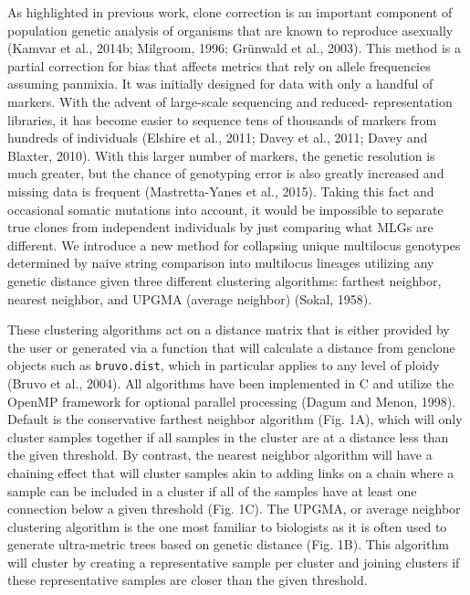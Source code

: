 \documentclass{frontiersSCNS} %
\begin{document}
As highlighted in previous work, clone correction is an important
component of population genetic analysis of organisms that are known to
reproduce asexually (Kamvar et al., 2014b; Milgroom, 1996; Grünwald et
al., 2003). This method is a partial correction for bias that affects
metrics that rely on allele frequencies assuming panmixia. It was
initially designed for data with only a handful of markers. With the
advent of large-scale sequencing and reduced- representation libraries,
it has become easier to sequence tens of thousands of markers from
hundreds of individuals (Elshire et al., 2011; Davey et al., 2011; Davey
and Blaxter, 2010). With this larger number of markers, the genetic
resolution is much greater, but the chance of genotyping error is also
greatly increased and missing data is frequent (Mastretta-Yanes et al.,
2015). Taking this fact and occasional somatic mutations into account,
it would be impossible to separate true clones from independent
individuals by just comparing what MLGs are different. We introduce a
new method for collapsing unique multilocus genotypes determined by
naive string comparison into multilocus lineages utilizing any genetic
distance given three different clustering algorithms: farthest neighbor,
nearest neighbor, and UPGMA (average neighbor) (Sokal, 1958).

These clustering algorithms act on a distance matrix that is either
provided by the user or generated via a function that will calculate a
distance from genclone objects such as \texttt{bruvo.dist}, which in
particular applies to any level of ploidy (Bruvo et al., 2004). All
algorithms have been implemented in C and utilize the OpenMP framework
for optional parallel processing (Dagum and Menon, 1998). Default is the
conservative farthest neighbor algorithm (Fig. 1A), which will only
cluster samples together if all samples in the cluster are at a distance
less than the given threshold. By contrast, the nearest neighbor
algorithm will have a chaining effect that will cluster samples akin to
adding links on a chain where a sample can be included in a cluster if
all of the samples have at least one connection below a given threshold
(Fig. 1C). The UPGMA, or average neighbor clustering algorithm is the
one most familiar to biologists as it is often used to generate
ultra-metric trees based on genetic distance (Fig. 1B). This algorithm
will cluster by creating a representative sample per cluster and joining
clusters if these representative samples are closer than the given
threshold.
\end{document}
